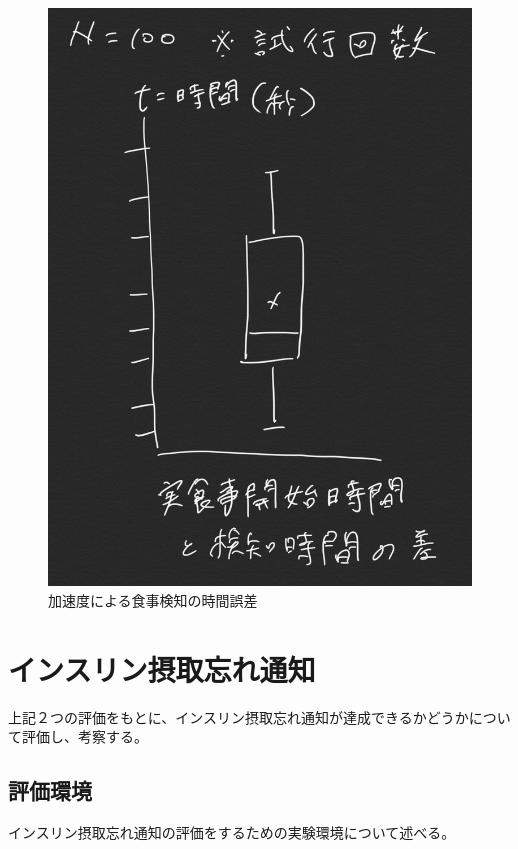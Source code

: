 \begin{figure}[htbp]
  \caption{加速度による食事検知の時間誤差}
  \label{fig:meal_box_n_whisker}
  \begin{center}
    \includegraphics[bb=0 0 1000 850,width=20cm]{assets/meal_box_n_whisker.png}
  \end{center}
\end{figure}

\section{インスリン摂取忘れ通知}
上記２つの評価をもとに、インスリン摂取忘れ通知が達成できるかどうかについて評価し、考察する。

\subsection{評価環境}
インスリン摂取忘れ通知の評価をするための実験環境について述べる。

